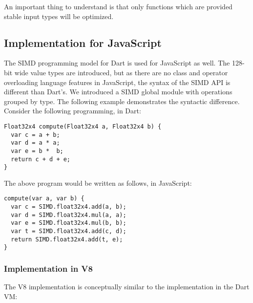 \documentclass[preprint]{sigplanconf}
\begin{document}
An important thing to understand is that only functions which are provided
stable input types will be optimized.

\subsection{Implementation for JavaScript}
\label{JS}

The SIMD programming model for Dart is used for JavaScript as well. The 128-bit
wide value types are introduced, but as there are no class and operator
overloading language features in JavaScript, the syntax of the SIMD API is
different than Dart's. We introduced a SIMD global module with operations
grouped by type. The following example demonstrates the syntactic difference.
Consider the following programming, in Dart:

\begin{small}
\begin{lstlisting}
Float32x4 compute(Float32x4 a, Float32x4 b) {
  var c = a + b;
  var d = a * a;
  var e = b *  b;
  return c + d + e;
}
\end{lstlisting}
\end{small}

The above program would be written as follows, in JavaScript:

\begin{small}
\begin{lstlisting}
compute(var a, var b) {
  var c = SIMD.float32x4.add(a, b);
  var d = SIMD.float32x4.mul(a, a);
  var e = SIMD.float32x4.mul(b, b);
  var t = SIMD.float32x4.add(c, d);
  return SIMD.float32x4.add(t, e);
}
\end{lstlisting}
\end{small}

\subsubsection{Implementation in V8}

The V8 implementation is conceptually similar to the implementation in the Dart
VM:
\end{document}
